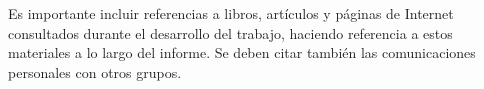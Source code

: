 \documentclass[11pt, a4paper, spanish]{article}
\begin{document}
\newpage
\begin{thebibliography}{1}

   Es importante incluir referencias a libros, artículos y páginas de Internet consultados durante el desarrollo del trabajo, haciendo referencia a estos materiales a lo largo del informe.
   Se deben citar también las comunicaciones personales con otros grupos.

\end{thebibliography}
\end{document}

